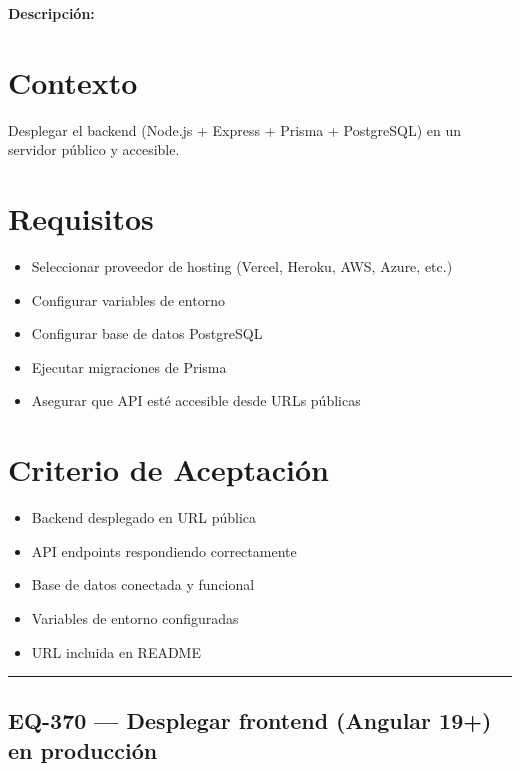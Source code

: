 \documentclass[
  spanish,
  11pt,
]{report}
\providecommand{\tightlist}{%
  \setlength{\itemsep}{0pt}\setlength{\parskip}{0pt}}
\begin{document}
\textbf{Descripción:}

\section{Contexto}\label{contexto-7}

Desplegar el backend (Node.js + Express + Prisma + PostgreSQL) en un
servidor público y accesible.

\section{Requisitos}\label{requisitos-6}

\begin{itemize}
\tightlist
\item
  Seleccionar proveedor de hosting (Vercel, Heroku, AWS, Azure, etc.)
\item
  Configurar variables de entorno
\item
  Configurar base de datos PostgreSQL
\item
  Ejecutar migraciones de Prisma
\item
  Asegurar que API esté accesible desde URLs públicas
\end{itemize}

\section{Criterio de Aceptación}\label{criterio-de-aceptaciuxf3n-6}

\begin{itemize}
\tightlist
\item[$\square$]
  Backend desplegado en URL pública
\item[$\square$]
  API endpoints respondiendo correctamente
\item[$\square$]
  Base de datos conectada y funcional
\item[$\square$]
  Variables de entorno configuradas
\item[$\square$]
  URL incluida en README
\end{itemize}

\begin{center}\rule{0.5\linewidth}{0.5pt}\end{center}

\subsection{EQ-370 --- Desplegar frontend (Angular 19+) en
producción}\label{eq-370-desplegar-frontend-angular-19-en-producciuxf3n}
\end{document}
